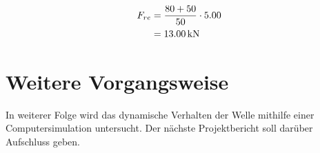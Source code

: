 \documentclass[
a4paper,     %
 headsepline, %
 halfparskip,     %
 fleqn,       %
12pt         %
]{scrartcl}  %
\begin{document}
\begin{equation}
  \label{eq:10}
  \begin{aligned}
    F_{re} & = \frac{80 + 50}{50} \cdot 5.00 \\
           & = \unit[13.00]{kN}    
  \end{aligned}
\end{equation}

\section{Weitere Vorgangsweise}
\label{sec:weit-vorg}

In weiterer Folge wird das dynamische Verhalten der Welle mithilfe einer Computersimulation untersucht. Der nächste Projektbericht soll darüber Aufschluss geben.



 \appendix  %




 

 

 
\end{document}
